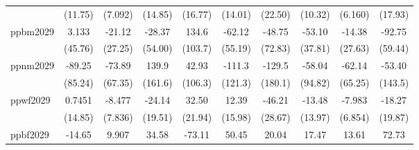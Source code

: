 \begin{table}[htbp]
\begin{tabular}{lccccccccc}
                                     & (11.75)                      & (7.092)                       & (14.85)                     & (16.77)                   & (14.01)                       & (22.50)                      & (10.32)                       & (6.160)                      & (17.93)\\   
      ppbm2029                       & 3.133                        & -21.12                        & -28.37                      & 134.6                     & -62.12                        & -48.75                       & -53.10                        & -14.38                       & -92.75\\   
                                     & (45.76)                      & (27.25)                       & (54.00)                     & (103.7)                   & (55.19)                       & (72.83)                      & (37.81)                       & (27.63)                      & (59.44)\\   
      ppnm2029                       & -89.25                       & -73.89                        & 139.9                       & 42.93                     & -111.3                        & -129.5                       & -58.04                        & -62.14                       & -53.40\\   
                                     & (85.24)                      & (67.35)                       & (161.6)                     & (106.3)                   & (121.3)                       & (180.1)                      & (94.82)                       & (65.25)                      & (143.5)\\   
      ppwf2029                       & 0.7451                       & -8.477                        & -24.14                      & 32.50                     & 12.39                         & -46.21                       & -13.48                        & -7.983                       & -18.27\\   
                                     & (14.85)                      & (7.836)                       & (19.51)                     & (21.94)                   & (15.98)                       & (28.67)                      & (13.97)                       & (6.854)                      & (19.87)\\   
      ppbf2029                       & -14.65                       & 9.907                         & 34.58                       & -73.11                    & 50.45                         & 20.04                        & 17.47                         & 13.61                        & 72.73\\   

\end{tabular}
\end{table}
